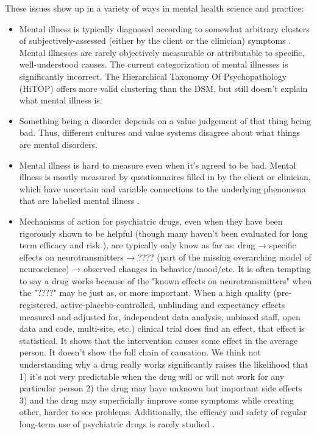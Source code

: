 \documentclass[12pt,letterpaper]{book}
\begin{document}
These issues show up in a variety of ways in mental health science and practice:
\begin{itemize}
    \item Mental illness is typically diagnosed according to somewhat arbitrary clusters of subjectively-assessed (either by the client or the clinician) symptoms \cite{kotov2017hierarchical}. Mental illnesses are rarely objectively measurable or attributable to specific, well-understood causes. The current categorization of mental illnesses is significantly incorrect. The Hierarchical Taxonomy Of Psychopathology (HiTOP) offers more valid clustering than the DSM, but still doesn't explain what mental illness is.
    \item Something being a disorder depends on a value judgement of that thing being bad. Thus, different cultures and value systems disagree about what things are mental disorders.
    \item Mental illness is hard to measure even when it's agreed to be bad. Mental illness is mostly measured by questionnaires filled in by the client or clinician, which have uncertain and variable connections to the underlying phenomena that are labelled mental illness \cite{uherRatingScales}.
    \item Mechanisms of action for psychiatric drugs, even when they have been rigorously shown to be helpful (though many haven’t been evaluated for long term efficacy and risk \cite{leuchtDecline}), are typically only know as far as: drug → specific effects on neurotransmitters → ???? (part of the missing overarching model of neuroscience) → observed changes in behavior/mood/etc. It is often tempting to say a drug works because of the "known effects on neurotransmitters" when the "????" may be just as, or more important. When a high quality (pre-registered, active-placebo-controlled, unblinding and expectancy effects measured and adjusted for, independent data analysis, unbiased staff, open data and code, multi-site, etc.) clinical trial does find an effect, that effect is statistical. It shows that the intervention causes some effect in the average person. It doesn’t show the full chain of causation. We think not understanding why a drug really works significantly raises the likelihood that 1) it's not very predictable when the drug will or will not work for any particular person 2) the drug may have unknown but important side effects 3) and the drug may superficially improve some symptoms while creating other, harder to see problems. Additionally, the efficacy and safety of regular long-term use of psychiatric drugs is rarely studied \cite{leuchtDecline}.

\end{itemize}
\end{document}

